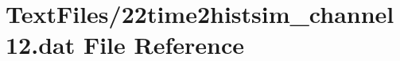 \hypertarget{22time2histsim__channel12_8dat}{}\section{Text\+Files/22time2histsim\+\_\+channel12.dat File Reference}
\label{22time2histsim__channel12_8dat}
